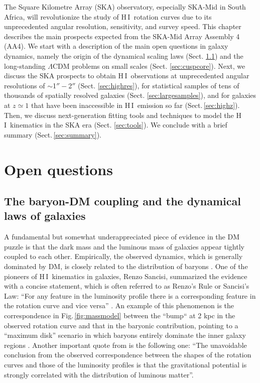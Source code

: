 \documentclass[a4paper,11pt]{article}
\newcommand{\hi } {{\rm H}\,{\small\rm I}}
\begin{document}
The Square Kilometre Array (SKA) observatory, especially SKA-Mid in South Africa, will revolutionize the study of \hi\ rotation curves due to its unprecedented angular resolution, sensitivity, and survey speed. This chapter describes the main prospects expected from the SKA-Mid Array Assembly 4 (AA4). We start with a description of the main open questions in galaxy dynamics, namely the origin of the dynamical scaling laws (Sect. \ref{sec:scalinglaws}) and the long-standing $\Lambda$CDM problems on small scales (Sect. \ref{sec:cuspcore}). Next, we discuss the SKA prospects to obtain \hi\ observations at unprecedented angular resolutions of $\sim$1$''-$2$''$ (Sect. \ref{sec:highres}), for statistical samples of tens of thousands of spatially resolved galaxies (Sect. \ref{sec:largesamples}), and for galaxies at $z\simeq1$ that have been inaccessible in \hi\ emission so far (Sect.\,\ref{sec:highz}). Then, we discuss next-generation fitting tools and techniques to model the \hi\ kinematics in the SKA era (Sect. \ref{sec:tools}). We conclude with a brief summary (Sect.\,\ref{sec:summary}).

\section{Open questions}\label{sec:questions}

\subsection{The baryon-DM coupling and the dynamical laws of galaxies}\label{sec:scalinglaws}

A fundamental but somewhat underappreciated piece of evidence in the DM puzzle is that the dark mass and the luminous mass of galaxies appear tightly coupled to each other. Empirically, the observed dynamics, which is generally dominated by DM, is closely related to the distribution of baryons \citep[e.g.,][]{Swaters2012}. One of the pioneers of \hi\ kinematics in galaxies, Renzo Sancisi, summarized the evidence with a concise statement, which is often referred to as Renzo's Rule or Sancisi's Law: ``For any feature in the luminosity profile there is a corresponding feature in the rotation curve and vice versa'' \citep{Sancisi2004}. An example of this phenomenon is the correspondence in Fig.\,\ref{fig:massmodel} between the ``bump`` at 2 kpc in the observed rotation curve and that in the baryonic contribution, pointing to a ``maximum disk'' scenario in which baryons entirely dominate the inner galaxy regions \citep{vanAlbada1986}. Another important quote from \citet{Sancisi2004} is the following one: ``The unavoidable conclusion from the observed correspondence between the shapes of the rotation curves and those of the luminosity profiles is that the gravitational potential is strongly correlated with the distribution of luminous matter''.
\end{document}
